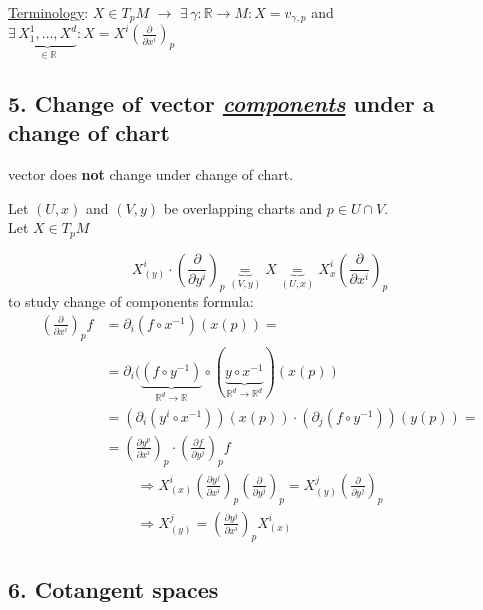 \documentclass[10pt]{amsart}
\begin{document}
\begin{multicols*}{2}
	\underline{Terminology}: $X \in T_pM$ $\to $ $\exists \, \gamma : \mathbb{R} \to M : X = v_{\gamma,p}$ and \\
	 $\exists \, \underbrace{ X_1^1 , \dots , X^d }_{\in \mathbb{R} } : X = X^i \left( \frac{ \partial }{ \partial x^i} \right)_p$
	
	
	
	\subsection{5. Change of vector \emph{\underline{components}} under a change of chart}
	
	 vector does \textbf{not} change under change of chart.
	
	Let $(U,x)$ and $(V,y)$ be overlapping charts and $p \in U\cap V$.  \\
	Let $X \in T_pM$
	
	\[
	X^i_{(y)}\cdot \left( \frac{ \partial }{ \partial y^i} \right)_p \underbrace{=}_{(V,y)} X \underbrace{=}_{ (U,x) } X^i_{x} \left( \frac{ \partial }{ \partial x^i} \right)_p
	\]
	to study change of components formula:
	\[
	\begin{aligned}
	\left( \frac{ \partial }{ \partial x^i} \right)_p f & = \partial_i(f\circ x^{-1} )(x(p)) =  \\
	& = \partial_i (\underbrace{ (f\circ y^{-1}) }_{\mathbb{R}^d \to \mathbb{R} } \circ (\underbrace{ y\circ x^{-1}}_{\mathbb{R}^d \to \mathbb{R}^d} )(x(p)) \\
	& = (\partial_i (y^i\circ x^{-1} ) )(x(p)) \cdot (\partial_j (f\circ y^{-1}) )(y(p)) = \\
	& = \boxed{ \left( \frac{ \partial y^p}{ \partial x^i} \right)_p \cdot \left( \frac{ \partial f}{ \partial y^j} \right)_p  } f
	\end{aligned}
	\]
	\[
	\begin{gathered}
	\Longrightarrow X^i_{(x)} \left( \frac{ \partial y^j}{ \partial x^i} \right)_p \left( \frac{ \partial }{ \partial y^j} \right)_p = X^j_{(y)}\left( \frac{ \partial }{ \partial y^j} \right)_p \\
	\Longrightarrow \boxed{ X^j_{(y)} = \left( \frac{ \partial y^j}{ \partial x^i} \right)_pX^i_{(x)} }
	\end{gathered}
	\]
	
	\subsection{6. Cotangent spaces }
	

\end{multicols*}
\end{document}
